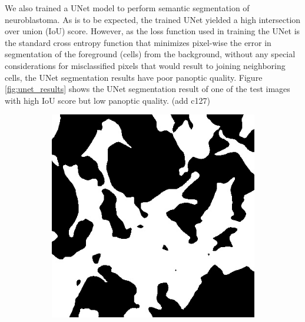 \documentclass[10pt, journal, compsoc]{IEEEtran}
\begin{document}
We also trained a UNet model to perform semantic segmentation of neuroblastoma. As is to be expected, the trained UNet yielded a high intersection over union (IoU) score. However, as the loss function used in training the UNet is the standard cross entropy function that minimizes pixel-wise the error in segmentation of the foreground (cells) from the background, without any special considerations for misclassified pixels that would result to joining neighboring cells, the UNet segmentation results have poor panoptic quality. Figure \ref{fig:unet_results} shows the UNet segmentation result of one of the test images with high IoU score but low panoptic quality. (add c127)

\begin{figure}
\centering
\begin{subfigure}[b]{0.45\linewidth}
\includegraphics[width=\linewidth]{deeplab/110115.jpg}
\caption{}
\end{subfigure}
\begin{subfigure}[b]{0.45\linewidth}

\end{subfigure}
\end{figure}
\end{document}
